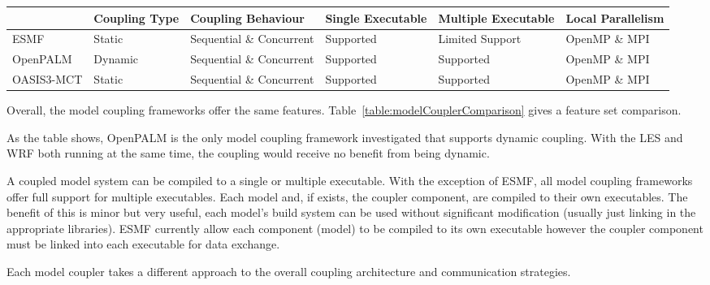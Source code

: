 \begin{figure*}
    \begin{tabular}{|l|l|l|l|l|l|}
        \hline
        & Coupling Type & Coupling Behaviour & Single Executable & Multiple
        Executable & Local Parallelism\\
        \hline
        ESMF & Static & Sequential \& Concurrent & Supported & Limited Support &
        OpenMP \& MPI\\
        \hline
        OpenPALM & Dynamic & Sequential \& Concurrent & Supported & Supported &
        OpenMP \& MPI\\
        \hline
        OASIS3-MCT & Static & Sequential \& Concurrent & Supported & Supported &
        OpenMP \& MPI\\
        \hline
    \end{tabular}
    \caption{Comparison of model coupling frameworks}
    \label{table:modelCouplerComparison}
\end{figure*}

Overall, the model coupling frameworks offer the same features.
Table~\ref{table:modelCouplerComparison} gives a feature set comparison.

As the table shows, OpenPALM is the only model coupling framework investigated
that supports dynamic coupling. With the LES and WRF both running at the same
time, the coupling would receive no benefit from being dynamic.

A coupled model system can be compiled to a single or multiple executable. With
the exception of ESMF, all model coupling frameworks offer full support for
multiple executables. Each model and, if exists, the coupler component, are
compiled to their own executables. The benefit of this is minor but very useful,
each model's build system can be used without significant modification (usually
just linking in the appropriate libraries). ESMF currently allow each component
(model) to be compiled to its own executable however the coupler component must
be linked into each executable for data exchange.

Each model coupler takes a different approach to the overall coupling
architecture and communication strategies.


